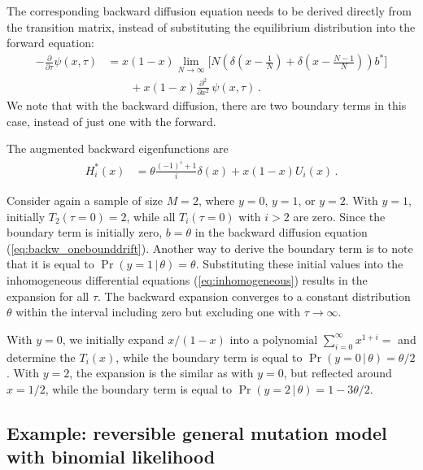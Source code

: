 \documentclass[preprint]{elsarticle}
\newcommand\given{{\,|\,}}
\begin{document}
The corresponding backward diffusion equation needs to be derived directly from the transition matrix, instead of substituting the equilibrium distribution into the forward equation:
\begin{equation}\label{eq:backw_onebounddrift}
\begin{split}
-\frac{\partial}{\partial \tau} \psi(x,\tau)&=
    x(1-x)\lim_{N\to\infty}\bigg[N\left(\delta(x-\tfrac1N)+\delta(x-\tfrac{N-1}N)\right)b^{*}\bigg]\\
    &\qquad+x(1-x)\frac{\partial^2}{\partial x^2}\,\psi(x,\tau)\,.
\end{split}
\end{equation}
We note that with the backward diffusion, there are two boundary terms in this case, instead of just one with the forward. 

The augmented backward eigenfunctions are
\begin{equation}\label{eq:backw_oneboundeigen}
\begin{split}
    H_i^{*}(x)&=\theta\tfrac{(-1)^i+1}{ i}\delta(x)+x(1-x)U_i(x)\,.
\end{split}
\end{equation}

Consider again a sample of size $M=2$, where $y=0$, $y=1$, or $y=2$. With $y=1$, initially $T_2(\tau=0)=2$, while all $T_i(\tau=0)$ with $i>2$ are zero. Since the boundary term is initially zero, $b=\theta$ in the backward diffusion equation (\ref{eq:backw_onebounddrift}). Another way to derive the boundary term is to note that it is equal to $\Pr(y=1\given \theta)=\theta$. Substituting these initial values into the inhomogeneous differential equations (\ref{eq:inhomogeneous}) results in the expansion for all $\tau$. The backward expansion converges to a constant distribution $\theta$ within the interval including zero but excluding one with $\tau\to\infty$.

With $y=0$, we initially expand $x/(1-x)$ into a polynomial $\sum_{i=0}^\infty x^{1+i}=$ and determine the $T_i(x)$, while the boundary term is equal to $\Pr(y=0\given \theta)=\theta/2$. With $y=2$, the expansion is the similar as with $y=0$, but reflected around $x=1/2$, while the boundary term is equal to $\Pr(y=2\given \theta)=1-3\theta/2$.

\subsection{Example: reversible general mutation model with binomial likelihood}
\end{document}

